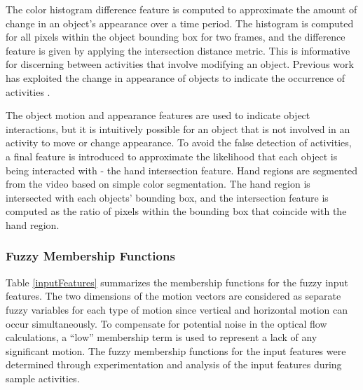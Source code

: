 \documentclass[12pt]{report}
\begin{document}
The color histogram difference feature is computed to approximate the amount of change in an object's appearance over a time period. The histogram is computed for all pixels within the object bounding box for two frames, and the difference feature is given by applying the intersection distance metric. This is informative for discerning between activities that involve modifying an object. Previous work has exploited the change in appearance of objects to indicate the occurrence of activities \cite{Pirsiavash2012}.

The object motion and appearance features are used to indicate object interactions, but it is intuitively possible for an object that is not involved in an activity to move or change appearance. To avoid the false detection of activities, a final feature is introduced to approximate the likelihood that each object is being interacted with - the hand intersection feature. Hand regions are segmented from the video based on simple color segmentation. The hand region is intersected with each objects' bounding box, and the intersection feature is computed as the ratio of pixels within the bounding box that coincide with the hand region.

\subsubsection{Fuzzy Membership Functions}
Table \ref{inputFeatures} summarizes the membership functions for the fuzzy input features. The two dimensions of the motion vectors are considered as separate fuzzy variables for each type of motion since vertical and horizontal motion can occur simultaneously. To compensate for potential noise in the optical flow calculations, a ``low'' membership term is used to represent a lack of any significant motion. The fuzzy membership functions for the input features were determined through experimentation and analysis of the input features during sample activities.
\end{document}
